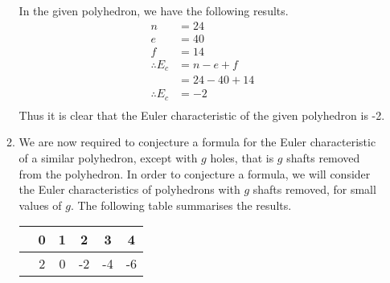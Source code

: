 \documentclass[a4paper]{article}
\begin{document}
\begin{enumerate}[label=\textbf{\arabic*.}]
\begin{enumerate}
\begin{center}

		\end{center}

		\pagebreak

		In the given polyhedron, we have the following results.
		\begin{align*}
		n & = 24\\
		e & = 40\\
		f & = 14\\
		\therefore E_{c} & = n - e + f\\
		& = 24 - 40 + 14\\
		\therefore E_{c} & = -2\\
		\end{align*}
		Thus it is clear that the Euler characteristic of the given polyhedron is -2.

		\bigbreak

		\item We are now required to conjecture a formula for the Euler characteristic of a similar polyhedron, except with $\displaystyle{g}$ holes, that is $\displaystyle{g}$ shafts removed from the polyhedron. In order to conjecture a formula, we will consider the Euler characteristics of polyhedrons with $\displaystyle{g}$ shafts removed, for small values of $\displaystyle{g}$. The following table summarises the results.

		\begin{center}
		\begin{tabular}{c|c c c c c}
		\text{$\displaystyle{g}$} & 0 & 1 & 2 & 3 & 4 \\
		\hline
		\text{$\displaystyle{E_{c}}$} & 2 & 0 & -2 & -4 & -6 \\
		\end{tabular}
		\end{center}


\end{enumerate}
\end{enumerate}
\end{document}
